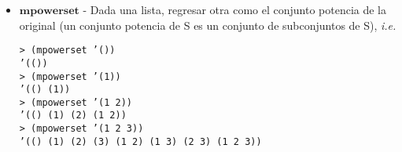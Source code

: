 \documentclass{article}
\begin{document}
\begin{itemize}
\item $\textbf{mpowerset}$ - Dada una lista, regresar otra como el
  conjunto potencia de la original (un conjunto potencia de S es un
  conjunto de subconjuntos de S), \textit{i.e.}
\begin{verbatim}
> (mpowerset ’())
’(())
> (mpowerset ’(1))
’(() (1))
> (mpowerset ’(1 2))
’(() (1) (2) (1 2))
> (mpowerset ’(1 2 3))
’(() (1) (2) (3) (1 2) (1 3) (2 3) (1 2 3))
\end{verbatim}
\end{itemize}
\end{document}
